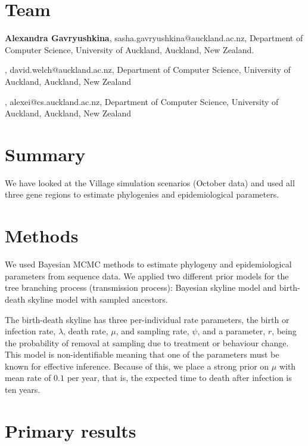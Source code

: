 \documentclass[11pt]{article}
\begin{document}
\section{Team}

{\bf Alexandra Gavryushkina}, sasha.gavryushkina@auckland.ac.nz, Department of Computer Science, University of Auckland, Auckland, New Zealand. 

\vskip2mm

, david.welch@auckland.ac.nz, Department of Computer Science, University of Auckland, Auckland, New Zealand

\vskip2mm

, alexei@cs.auckland.ac.nz, Department of Computer Science, University of Auckland, Auckland, New Zealand


\section{Summary}

We have looked at the Village simulation scenarios (October data) and used all three gene regions to estimate phylogenies and epidemiological parameters.

\section{Methods}

We used Bayesian MCMC methods to estimate phylogeny and epidemiological parameters from sequence data. We applied two different prior models for the tree branching process (transmission process): Bayesian skyline model and birth-death skyline model with sampled ancestors. 

The birth-death skyline has three per-individual rate parameters, the birth or infection rate, $\lambda$, death rate, $\mu$, and sampling rate, $\psi$, and a parameter,  $r$, being the probability of removal at sampling due to treatment or behaviour change. This model is non-identifiable meaning that one of the parameters must be known for effective inference. Because of this, we place a strong prior on $\mu$ with mean rate of $0.1$ per year, that is, the expected time to death after infection is ten years. 

\section{Primary results}
\end{document}
